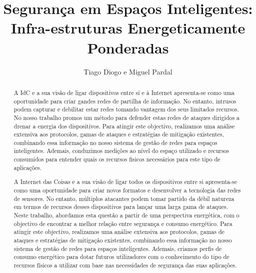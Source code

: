 \documentclass{llncs}
\begin{document}
\title{Segurança em Espaços Inteligentes: Infra-estruturas Energeticamente Ponderadas}
%
%
\author{Tiago Diogo e Miguel Pardal}
%
%
%

\maketitle              %

\begin{abstract}
A \ac{IdC} e a sua visão de ligar dispositivos entre sí e à Internet apresenta-se como uma oportunidade para criar gandes redes de partilha de informação. No entanto, intrusos podem capturar e debilitar estar redes tomando vantagem dos seus limitados recursos. No nosso trabalho promos um método para defender estas redes de ataques dirigidos a drenar a energia dos dispositivos. Para atingir este objectivo, realizamos uma análise extensiva aos protocolos, gamas de ataques e estratégias de mitigação existentes, combinando essa informação no nosso sistema de gestão de redes para espaços inteligentes. Ademais, conduzimos medições ao nível do espaço utilizado e recursos consumidos para entender quais os recursos fisicos necessários para este tipo de aplicações.

A Internet das Coisas e a sua visão de ligar todos os dispositivos entre si apresenta-se como uma oportunidade para criar novos formatos e desenvolver a tecnologia das redes de sensores. No entanto, múltiplos atacantes podem tomar partido da débil natureza em termos de recursos desses dispositivos para lançar uma larga gama de ataques. Neste trabalho, abordamos esta questão a partir de uma perspectiva energética, com o objectivo de encontrar a melhor relação entre segurança e consumo energético. Para atingir este objectivo, realizamos uma análise extensiva aos protocolos, gamas de ataques e estratégias de mitigação existentes, combinando essa informação no nosso sistema de gestão de redes para espaços inteligentes. Ademais, criamos perfis de consumo energético para dotar futuros utilizadores com o conhecimento do tipo de recursos físicos a utilizar com base nas necessidades de segurança das suas aplicações.
\end{abstract}
\end{document}
